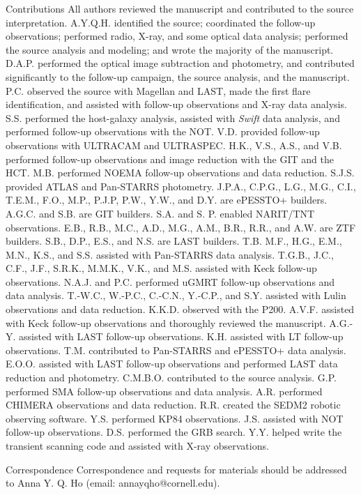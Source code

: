 \documentclass{nature_plusfigure}
\begin{document}
\begin{addendum}
\item[Contributions] 
All authors reviewed the manuscript and contributed to the source interpretation.
A.Y.Q.H. identified the source; coordinated the follow-up observations; performed radio, X-ray, and some optical data analysis; performed the source analysis and modeling; and wrote the majority of the manuscript. D.A.P. performed the optical image subtraction and photometry, and contributed significantly to the follow-up campaign, the source analysis, and the manuscript. P.C. observed the source with Magellan and LAST, made the first flare identification, and assisted with follow-up observations and X-ray data analysis. S.S. performed the host-galaxy analysis, assisted with {\it Swift} data analysis, and performed follow-up observations with the NOT. V.D. provided follow-up observations with ULTRACAM and ULTRASPEC. H.K., V.S., A.S., and V.B. performed follow-up observations and image reduction with the GIT and the HCT. M.B. performed NOEMA follow-up observations and data reduction. S.J.S. provided ATLAS and Pan-STARRS photometry. J.P.A., C.P.G., L.G., M.G., C.I., T.E.M., F.O., M.P., P.J.P, P.W., Y.W., and D.Y. are ePESSTO+ builders. A.G.C. and S.B. are GIT builders. S.A. and S. P. enabled NARIT/TNT observations. E.B., R.B., M.C., A.D., M.G., A.M., B.R., R.R., and A.W. are ZTF builders. S.B., D.P., E.S., and N.S. are LAST builders. T.B. M.F., H.G., E.M., M.N., K.S., and S.S. assisted with Pan-STARRS data analysis. T.G.B., J.C., C.F., J.F., S.R.K., M.M.K., V.K., and M.S. assisted with Keck follow-up observations. N.A.J. and P.C. performed uGMRT follow-up observations and data analysis. T.-W.C., W.-P.C., C.-C.N., Y.-C.P., and S.Y. assisted with Lulin observations and data reduction. K.K.D. observed with the P200. A.V.F. assisted with Keck follow-up observations and thoroughly reviewed the manuscript. A.G.-Y. assisted with LAST follow-up observations. K.H. assisted with LT follow-up observations. T.M. contributed to Pan-STARRS and ePESSTO+ data analysis. E.O.O. assisted with LAST follow-up observations and performed LAST data reduction and photometry. C.M.B.O. contributed to the source analysis. G.P. performed SMA follow-up observations and data analysis. A.R. performed CHIMERA observations and data reduction. R.R. created the SEDM2 robotic observing software. Y.S. performed KP84 observations. J.S. assisted with NOT follow-up observations. D.S. performed the GRB search. Y.Y. helped write the transient scanning code and assisted with X-ray observations.


 \item[Correspondence] Correspondence and requests for materials
should be addressed to Anna Y. Q. Ho (email: annayqho@cornell.edu).


\end{addendum}
\end{document}
